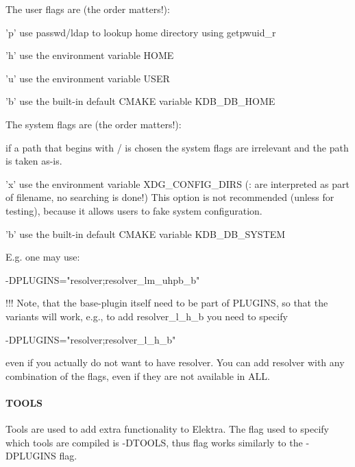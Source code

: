 The user flags are (the order matters!)\+:


\begin{DoxyItemize}
\item 'p' use passwd/ldap to lookup home directory using getpwuid\+\_\+r
\item 'h' use the environment variable H\+O\+M\+E
\item 'u' use the environment variable U\+S\+E\+R
\item 'b' use the built-\/in default C\+M\+A\+K\+E variable K\+D\+B\+\_\+\+D\+B\+\_\+\+H\+O\+M\+E
\end{DoxyItemize}

The system flags are (the order matters!)\+:


\begin{DoxyItemize}
\item if a path that begins with / is chosen the system flags are irrelevant and the path is taken as-\/is.
\item 'x' use the environment variable X\+D\+G\+\_\+\+C\+O\+N\+F\+I\+G\+\_\+\+D\+I\+R\+S (\+: are interpreted as part of filename, no searching is done!) This option is not recommended (unless for testing), because it allows users to fake system configuration.
\item 'b' use the built-\/in default C\+M\+A\+K\+E variable K\+D\+B\+\_\+\+D\+B\+\_\+\+S\+Y\+S\+T\+E\+M
\end{DoxyItemize}

E.\+g. one may use\+: \begin{DoxyVerb}    -DPLUGINS="resolver;resolver_lm_uhpb_b"
\end{DoxyVerb}


!!! Note, that the base-\/plugin itself need to be part of P\+L\+U\+G\+I\+N\+S, so that the variants will work, e.\+g., to add resolver\+\_\+l\+\_\+h\+\_\+b you need to specify \begin{DoxyVerb}    -DPLUGINS="resolver;resolver_l_h_b"
\end{DoxyVerb}


even if you actually do not want to have resolver. You can add resolver with any combination of the flags, even if they are not available in A\+L\+L.

\paragraph*{T\+O\+O\+L\+S}

Tools are used to add extra functionality to Elektra. The flag used to specify which tools are compiled is {\ttfamily -\/\+D\+T\+O\+O\+L\+S}, thus flag works similarly to the {\ttfamily -\/\+D\+P\+L\+U\+G\+I\+N\+S} flag.

